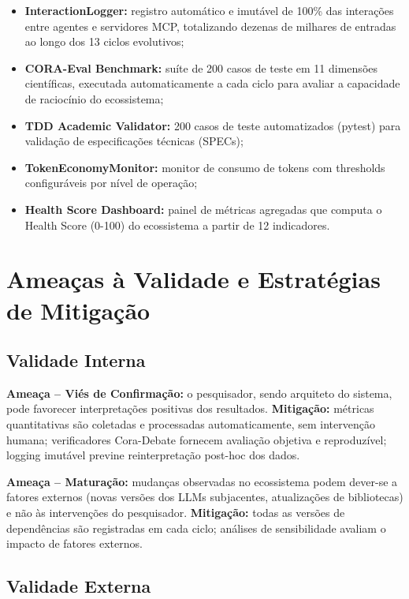 \documentclass[12pt,a4paper,sumario=tradicional,openany]{abntex2}
\begin{document}
\begin{itemize}
    \item \textbf{InteractionLogger:} registro automático e imutável de 100\% das interações entre agentes e servidores MCP, totalizando dezenas de milhares de entradas ao longo dos 13 ciclos evolutivos;
    \item \textbf{CORA-Eval Benchmark:} suíte de 200 casos de teste em 11 dimensões científicas, executada automaticamente a cada ciclo para avaliar a capacidade de raciocínio do ecossistema;
    \item \textbf{TDD Academic Validator:} 200 casos de teste automatizados (pytest) para validação de especificações técnicas (SPECs);
    \item \textbf{TokenEconomyMonitor:} monitor de consumo de tokens com thresholds configuráveis por nível de operação;
    \item \textbf{Health Score Dashboard:} painel de métricas agregadas que computa o Health Score (0-100) do ecossistema a partir de 12 indicadores.
\end{itemize}

\section{Ameaças à Validade e Estratégias de Mitigação}

\subsection{Validade Interna}

\textbf{Ameaça -- Viés de Confirmação:} o pesquisador, sendo arquiteto do sistema, pode favorecer interpretações positivas dos resultados. \textbf{Mitigação:} métricas quantitativas são coletadas e processadas automaticamente, sem intervenção humana; verificadores Cora-Debate fornecem avaliação objetiva e reproduzível; logging imutável previne reinterpretação post-hoc dos dados.

\textbf{Ameaça -- Maturação:} mudanças observadas no ecossistema podem dever-se a fatores externos (novas versões dos LLMs subjacentes, atualizações de bibliotecas) e não às intervenções do pesquisador. \textbf{Mitigação:} todas as versões de dependências são registradas em cada ciclo; análises de sensibilidade avaliam o impacto de fatores externos.

\subsection{Validade Externa}
\end{document}
